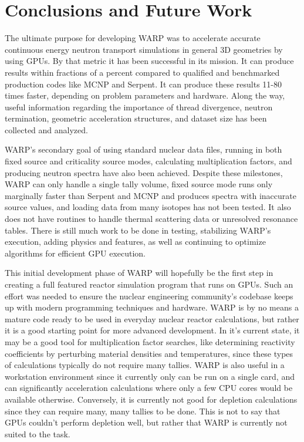 \chapter{Conclusions and Future Work}
\label{chap:conclusions}

The ultimate purpose for developing WARP was to accelerate accurate continuous energy neutron transport simulations in general 3D geometries by using GPUs.  By that metric it has been successful in its mission.  It can produce results within fractions of a percent compared to qualified and benchmarked production codes like MCNP and Serpent.  It can produce these results 11-80 times faster, depending on problem parameters and hardware.  Along the way, useful information regarding the importance of thread divergence, neutron termination, geometric acceleration structures, and dataset size has been collected and analyzed.

WARP's secondary goal of using standard nuclear data files, running in both fixed source and criticality source modes, calculating multiplication factors, and producing neutron spectra have also been achieved.  Despite these milestones, WARP can only handle a single tally volume, fixed source mode runs only marginally faster than Serpent and MCNP and produces spectra with inaccurate source values, and loading data from many isotopes has not been tested.  It also does not have routines to handle thermal scattering data or unresolved resonance tables. There is still much work to be done in testing, stabilizing WARP's execution, adding physics and features, as well as continuing to optimize algorithms for efficient GPU execution.

This initial development phase of WARP will hopefully be the first step in creating a full featured reactor simulation program that runs on GPUs.  Such an effort was needed to ensure the nuclear engineering community's codebase keeps up with modern programming techniques and hardware.  WARP is by no means a mature code ready to be used in everyday nuclear reactor calculations, but rather it is a good starting point for more advanced development.  In it's current state, it may be a good tool for multiplication factor searches, like determining reactivity coefficients by perturbing material densities and temperatures, since these types of calculations typically do not require many tallies.  WARP is also useful in a workstation environment since it currently only can be run on a single card, and can significantly acceleration calculations where only a few CPU cores would be available otherwise.  Conversely, it is currently not good for depletion calculations since they can require many, many tallies to be done.  This is not to say that GPUs couldn't perform depletion well, but rather that WARP is currently not suited to the task.

